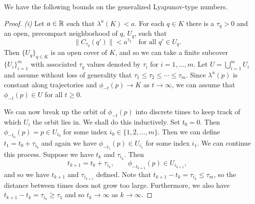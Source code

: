 We have the following bounds on the generalized Lyapunov-type numbers.
\lyapunovbound*
\begin{proof}
	\emph{(i)} Let \(a\in\mathbb{R}\) such that \(\lambda^u(K) < a\). For each \(q\in K\) there is a \(\tau_q>0\) and an open, precompact neighborhood of \(q\), \(U_q\), such that \[\| C_{\tau_q}(q')\| < a^{\tau_q} \quad \text{for all } q'\in U_q.\] Then \(\{ U_q \}_{q\in K}\) is an open cover of \(K\), and so we can take a finite subcover \(\{U_i\}_{i=1}^m\) with associated \(\tau_q\) values denoted by \(\tau_i\) for \(i = 1,\ldots, m\). Let \(U = \bigcup_{i=1}^m U_i\) and assume without loss of generality that \(\tau_1\leq \tau_2\leq\cdots\leq \tau_m\). Since \(\lambda^u(p)\) is constant along trajectories and \(\phi_{-t}(p) \to K\) as \(t\to\infty\), we can assume that \(\phi_{-t}(p) \in U\) for all \(t\geq 0.\) 
	
	We can now break up the orbit of \(\phi_{-t}(p)\) into discrete times to keep track of which \(U_i\) the orbit lies in. We shall do this inductively. Set \(t_0 = 0\). Then \(\phi_{-t_0}(p) = p \in U_{i_0}\) for some index \(i_0\in \{1,2,\ldots, m\}\). Then we can define \(t_1 = t_0 + \tau_{i_0}\) and again we have \(\phi_{-t_1}(p) \in U_{i_1}\) for some index \(i_1\). We can continue this process. Suppose we have \(t_k\) and \(\tau_{i_k}\). Then
	\begin{equation*}
		t_{k+1} = t_k + \tau_{i_k}, \qquad \phi_{-t_{k+1}}(p) \in U_{i_{k+1}},
	\end{equation*}
	and so we have \(t_{k+1}\) and \(\tau_{i_{k+1}}\) defined. Note that \(t_{k+1} - t_k = \tau_{i_k} \leq \tau_{m}\), so the distance between times does not grow too large. Furthermore, we also have \(t_{k+1} - t_k = \tau_{i_k} \geq \tau_1\) and so \(t_k \to \infty\) as \(k\to\infty.\)
	

\end{proof}
